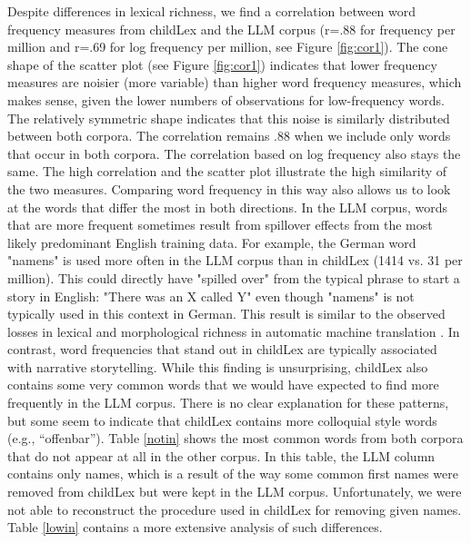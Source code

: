 \documentclass[doc, a4paper, anonymous]{apa7}
\begin{document}
Despite differences in lexical richness, we find a correlation between word frequency measures from childLex and the LLM corpus (r=.88 for frequency per million and r=.69 for log frequency per million, see Figure \ref{fig:cor1}). The cone shape of the scatter plot (see Figure \ref{fig:cor1}) indicates that lower frequency measures are noisier (more variable) than higher word frequency measures, which makes sense, given the lower numbers of observations for low-frequency words. The relatively symmetric shape indicates that this noise is similarly distributed between both corpora. The correlation remains .88 when we include only words that occur in both corpora. The correlation based on log frequency also stays the same. The high correlation and the scatter plot illustrate the high similarity of the two measures. Comparing word frequency in this way also allows us to look at the words that differ the most in both directions. In the LLM corpus, words that are more frequent sometimes result from spillover effects from the most likely predominant English training data. For example, the German word "namens" is used more often in the LLM corpus than in childLex (1414 vs. 31 per million). This could directly have "spilled over" from the typical phrase to start a story in English: "There was an X called Y" even though "namens" is not typically used in this context in German. This result is similar to the observed losses in lexical and morphological richness in automatic machine translation \citep{vanmassenhove_machine_2021}. In contrast, word frequencies that stand out in childLex are typically associated with narrative storytelling. While this finding is unsurprising, childLex also contains some very common words that we would have expected to find more frequently in the LLM corpus. There is no clear explanation for these patterns, but some seem to indicate that childLex contains more colloquial style words (e.g., “offenbar”). Table \ref{notin} shows the most common words from both corpora that do not appear at all in the other corpus. In this table, the LLM column contains only names, which is a result of the way some common first names were removed from childLex but were kept in the LLM corpus. Unfortunately, we were not able to reconstruct the procedure used in childLex for removing given names. Table \ref{lowin} contains a more extensive analysis of such differences. 
\end{document}
